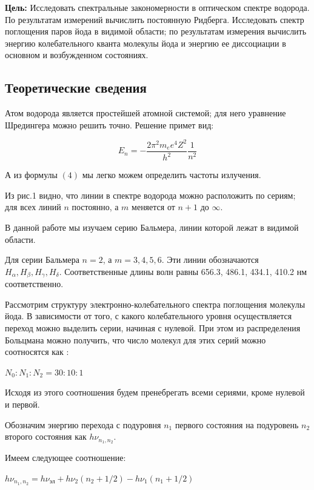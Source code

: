 \documentclass[12pt,a4paper]{article}
\begin{document}
     \textbf{Цель:} Исследовать спектральные закономерности в оптическом спектре водорода. По результатам измерений вычислить постоянную Ридберга. Исследовать спектр поглощения паров йода в видимой области; по результатам измерения вычислить энергию колебательного кванта молекулы йода и энергию ее диссоциации в основном и возбужденном состояниях.
	


\subsection{Теоретические сведения}

Атом водорода является простейшей атомной системой; для него уравнение Шредингера можно решить точно. Решение примет вид:


\begin{equation}
E_n = - \frac{2\pi^2m_ee^4Z^2}{h^2}\frac{1}{n^2}
\end{equation}

А из формулы $(4)$ мы легко можем определить частоты излучения. 

Из рис.1 видно, что линии в спектре водорода можно расположить по сериям; для всех линий $n$ постоянно, а $m$ меняется от $n+1$ до $\infty$. 

В данной работе мы изучаем серию Бальмера, линии которой лежат в видимой области. 

Для серии Бальмера $n=2$, а $m = 3, 4, 5, 6$. Эти линии обозначаются $H_{\alpha}, H_{\beta}, H_{\gamma}, H_{\delta}$. Соответственные длины волн равны 656.3, 486.1, 434.1, 410.2 нм соответственно.

Рассмотрим структуру электронно-колебательного спектра поглощения молекулы йода. В зависимости от того, с какого колебательного уровня осуществляется переход можно выделить серии, начиная с нулевой. При этом из распределения Больцмана можно получить, что число молекул для этих серий можно соотносятся как :

$N_0 : N_1 : N_2 = 30 : 10 : 1$

Исходя из этого соотношения будем пренебрегать всеми сериями, кроме нулевой и первой.

     Обозначим энергию перехода с подуровня $n_1$ первого состояния на подуровень $n_2$ второго состояния как $h\nu_{n_1,n_2}$.
     
Имеем следующее соотношение:

\begin{large}
$h\nu_{n_1,n_2} = h\nu_\text{эл}+h\nu_2(n_2+1/2) - h\nu_1(n_1+1/2)$
\end{large}
\end{document}
